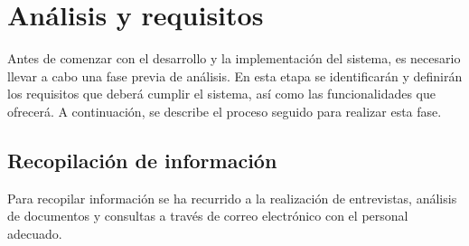 \chapter{Análisis y requisitos}\label{cap:especificación}

Antes de comenzar con el desarrollo y la implementación del sistema, es necesario llevar a cabo una fase previa de análisis. 
En esta etapa se identificarán y definirán los requisitos que deberá cumplir el sistema, así como las funcionalidades que 
ofrecerá. A continuación, se describe el proceso seguido para realizar esta fase.

\section{Recopilación de información}

Para recopilar información se ha recurrido a la realización de entrevistas, análisis de documentos y consultas a través
de correo electrónico con el personal adecuado.


